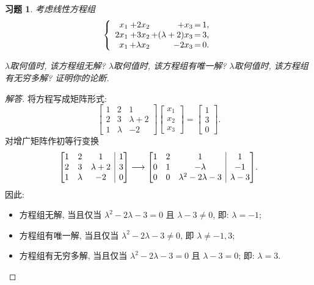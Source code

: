 \documentclass[UTF8]{ctexart}
\newenvironment{bmatriX}[1]{\left[\hskip -\arraycolsep \begin{array}{#1}}{\end{array}\hskip -\arraycolsep\right]}
\newtheorem{ex}[thm]{习题}
\begin{document}
\begin{ex}
考虑线性方程组
\[
\left\{\begin{array}{r@{\,}r@{\,}r@{\,}r@{\,}r}
	x_1 &+2x_2 &+x_3 & =& 1, \\
	2x_1&+3x_2&+(\lambda+2)x_3&=&3, \\
	x_1&+\lambda x_2&-2x_3 &=&0.
\end{array}\right.
\]

$\lambda$取何值时, 该方程组无解? $\lambda$取何值时, 该方程组有唯一解? $\lambda$取何值时, 该方程组有无穷多解? 证明你的论断.
\end{ex}
\begin{proof}[解答]
将方程写成矩阵形式:
	\[\begin{bmatrix} 1 & 2 & 1 \\ 2 & 3 & \lambda +2 \\ 1 & \lambda & -2 \end{bmatrix}\begin{bmatrix}
		x_1 \\ x_2 \\x_3
	\end{bmatrix}=\begin{bmatrix}
	1 \\ 3  \\ 0
\end{bmatrix}.\]
对增广矩阵作初等行变换
\[
\begin{bmatriX}{ccc|c} 1 & 2 & 1 &1 \\ 2 & 3 & \lambda+2 & 3 \\ 1 & \lambda & -2& 0 \end{bmatriX}
\longrightarrow
\begin{bmatriX}{ccc|c} 1 & 2 & 1 &1 \\ 0 & 1 & -\lambda & -1 \\ 0 & 0 & \lambda^2-2\lambda-3& \lambda-3 \end{bmatriX}
.
\]
因此:
\begin{itemize}
	\item 方程组无解, 当且仅当 $\lambda^2-2\lambda-3=0$ 且 $\lambda-3\neq 0$, 即: $\lambda=-1$;
	\item 方程组有唯一解, 当且仅当 $\lambda^2-2\lambda-3\neq 0$, 即 $\lambda\neq -1,3$;
	\item 方程组有无穷多解, 当且仅当 $\lambda^2-2\lambda-3=0$ 且 $\lambda-3= 0$; 即: $\lambda=3$.
	\end{itemize}
\end{proof}
\end{document}
